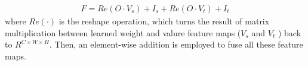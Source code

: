 \documentclass[12pt]{article}
\begin{document}
\begin{equation}
\label{sta}
\begin{aligned}
   F = Re(O \cdot V_s)+ I_s + Re(O \cdot V_t)+ I_t 
 \end{aligned}
\end{equation} where $Re(\cdot)$ is the reshape operation, which turns the result of matrix multiplication between learned weight and valure feature maps ($V_s$ and $V_t$ ) back to $R^{C \times W \times H}$. Then, an element-wise addition is employed to fuse all these feature maps.
 
\begin{comment}
@inproceedings{wang2016saliency,
  title={Saliency detection with recurrent fully convolutional networks},
  author={Wang, Linzhao and Wang, Lijun and Lu, Huchuan and Zhang, Pingping and Ruan, Xiang},
  booktitle={European conference on computer vision},
  pages={825--841},
  year={2016},
  organization={Springer}
}

@inproceedings{hu2018squeeze,
  title={Squeeze-and-excitation networks},
  author={Hu, Jie and Shen, Li and Sun, Gang},
  booktitle={Proceedings of the IEEE conference on computer vision and pattern recognition},
  pages={7132--7141},
  year={2018}
}

@article{chen2017rethinking,
  title={Rethinking atrous convolution for semantic image segmentation},
  author={Chen, Liang-Chieh and Papandreou, George and Schroff, Florian and Adam, Hartwig},
  journal={arXiv preprint arXiv:1706.05587},
  year={2017}
}

@inproceedings{deng2018r3net,
  title={R3Net: Recurrent residual refinement network for saliency detection},
  author={Deng, Zijun and Hu, Xiaowei and Zhu, Lei and Xu, Xuemiao and Qin, Jing and Han, Guoqiang and Heng, Pheng-Ann},
  booktitle={Proceedings of the 27th International Joint Conference on Artificial Intelligence},
  pages={684--690},
  year={2018},
  organization={AAAI Press}
}
	
@inproceedings{fu2019dual,
  title={Dual attention network for scene segmentation},
  author={Fu, Jun and Liu, Jing and Tian, Haijie and Li, Yong and Bao, Yongjun and Fang, Zhiwei and Lu, Hanqing},
  booktitle={Proceedings of the IEEE Conference on Computer Vision and Pattern Recognition},
  pages={3146--3154},
  year={2019}
}

@article{yuan2018ocnet,
  title={Ocnet: Object context network for scene parsing},
  author={Yuan, Yuhui and Wang, Jingdong},
  journal={arXiv preprint arXiv:1809.00916},
  year={2018}
}


\end{comment}
\end{document}

